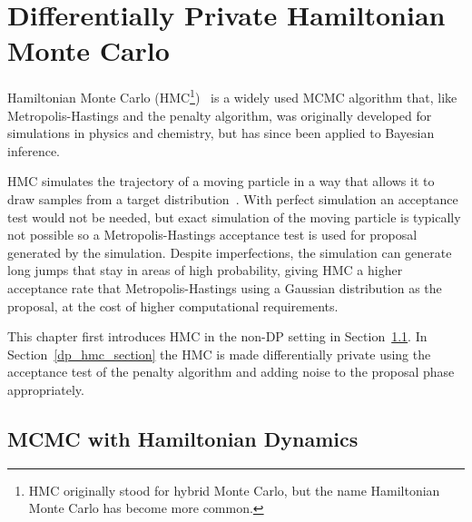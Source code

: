 \documentclass[english,twoside,openright]{HYgraduMLDS}
\begin{document}
%
%

\chapter{Differentially Private Hamiltonian Monte Carlo}

Hamiltonian Monte Carlo (HMC\footnote{
    HMC originally stood for hybrid Monte Carlo, 
    but the name Hamiltonian Monte Carlo has become more common.
})~\cite{neal2012mcmc} is a widely used MCMC algorithm that, like 
Metropolis-Hastings and the penalty algorithm, was originally developed 
for simulations in physics and chemistry, but has since been applied to 
Bayesian inference. 

HMC simulates the trajectory of a moving particle in a way 
that allows it to draw samples from a target distribution~\cite{neal2012mcmc}. 
With perfect simulation 
an acceptance test would not be needed, but exact simulation of the moving particle 
is typically not possible so a Metropolis-Hastings acceptance test is used
for proposal generated by the simulation. Despite imperfections, the simulation can generate long jumps 
that stay in areas of high probability, giving HMC a higher acceptance rate 
that Metropolis-Hastings using a Gaussian distribution as the proposal, at the 
cost of higher computational requirements.

This chapter first introduces HMC in the non-DP setting in Section~\ref{hmc_basics_section}.
In Section~\ref{dp_hmc_section} the HMC is made differentially private using the 
acceptance test of the penalty algorithm and adding noise to the proposal phase 
appropriately.

\section{MCMC with Hamiltonian Dynamics}\label{hmc_basics_section}
\end{document}
